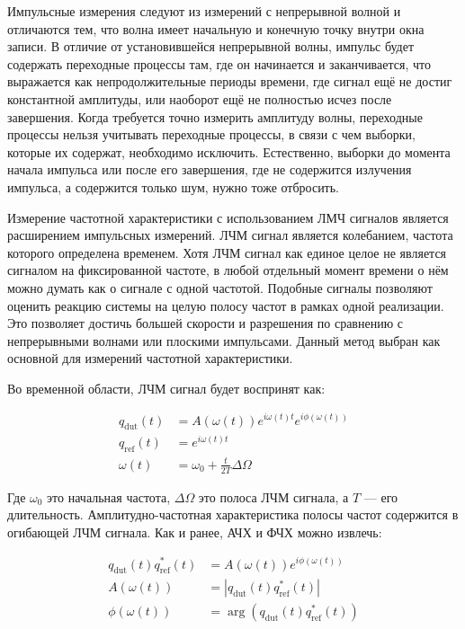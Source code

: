 \documentclass{report}
\begin{document}
Импульсные измерения следуют из измерений с непрерывной волной и отличаются тем, что волна имеет начальную и конечную точку внутри окна записи. В отличие от установившейся непрерывной волны, импульс будет содержать переходные процессы там, где он начинается и заканчивается, что выражается как непродолжительные периоды времени, где сигнал ещё не достиг константной амплитуды, или наоборот ещё не полностью исчез после завершения. Когда требуется точно измерить амплитуду волны, переходные процессы нельзя учитывать переходные процессы, в связи с чем выборки, которые их содержат, необходимо исключить. Естественно, выборки до момента начала импульса или после его завершения, где не содержится излучения импульса, а содержится только шум, нужно тоже отбросить.

Измерение частотной характеристики с использованием ЛМЧ сигналов является расширением импульсных измерений. ЛЧМ сигнал является колебанием, частота которого определена временем. Хотя ЛЧМ сигнал как единое целое не является сигналом на фиксированной частоте, в любой отдельный момент времени о нём можно думать как о сигнале с одной частотой. Подобные сигналы позволяют оценить реакцию системы на целую полосу частот в рамках одной реализации. Это позволяет достичь большей скорости и разрешения по сравнению с непрерывными волнами или плоскими импульсами. Данный метод выбран как основной для измерений частотной характеристики.

Во временной области, ЛЧМ сигнал будет воспринят как:

\begin{align}
q_\text{dut}(t) &= A(\omega(t)) e^{i \omega(t) t} e^{i \phi(\omega(t)) } \\
q_\text{ref}(t) &= e^{i \omega(t) t} \\
\omega(t) &= \omega_0 + \frac{t}{2T} \Delta \Omega
\end{align}

Где $\omega_0$ это начальная частота, $\Delta \Omega$ это полоса ЛЧМ сигнала, а $T$ --- его длительность. Амплитудно-частотная характеристика полосы частот содержится в огибающей ЛЧМ сигнала. Как и ранее, АЧХ и ФЧХ можно извлечь:

\begin{align}
q_\text{dut}(t) q^*_\text{ref}(t) &= A(\omega(t)) e^{i \phi(\omega(t)) } \\
A(\omega(t)) &= \left| q_\text{dut}(t) q^*_\text{ref}(t) \right| \\
\phi(\omega(t)) &= \arg\left( q_\text{dut}(t) q^*_\text{ref}(t) \right)
\end{align}
\end{document}
